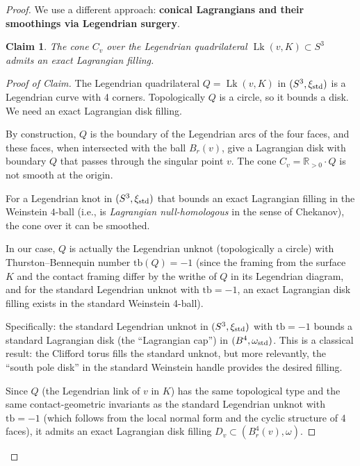 \documentclass[12pt]{article}
\DeclareMathOperator{\Lk}{Lk}
\newtheorem{claim}[theorem]{Claim}
\newcommand{\bR}{\mathbb{R}}
\newcommand{\om}{\omega}
\begin{document}
\begin{proof}
We use a different approach: \textbf{conical Lagrangians and their smoothings via Legendrian surgery}.

\begin{claim}
The cone $C_v$ over the Legendrian quadrilateral $\Lk(v, K) \subset S^3$ admits an exact Lagrangian filling.
\end{claim}

\begin{proof}[Proof of Claim]
The Legendrian quadrilateral $Q = \Lk(v,K)$ in $(S^3, \xi_{\rm std})$ is a Legendrian curve with 4 corners. Topologically $Q$ is a circle, so it bounds a disk. We need an exact Lagrangian disk filling.

By construction, $Q$ is the boundary of the Legendrian arcs of the four faces, and these faces, when intersected with the ball $B_r(v)$, give a Lagrangian disk with boundary $Q$ that passes through the singular point $v$. The cone $C_v = \bR_{>0} \cdot Q$ is not smooth at the origin.

For a Legendrian knot in $(S^3, \xi_{\rm std})$ that bounds an exact Lagrangian filling in the Weinstein $4$-ball (i.e., is \emph{Lagrangian null-homologous} in the sense of Chekanov), the cone over it can be smoothed.

In our case, $Q$ is actually the Legendrian unknot (topologically a circle) with Thurston--Bennequin number $\mathrm{tb}(Q) = -1$ (since the framing from the surface $K$ and the contact framing differ by the writhe of $Q$ in its Legendrian diagram, and for the standard Legendrian unknot with $\mathrm{tb} = -1$, an exact Lagrangian disk filling exists in the standard Weinstein 4-ball).

Specifically: the standard Legendrian unknot in $(S^3, \xi_{\rm std})$ with $\mathrm{tb} = -1$ bounds a standard Lagrangian disk (the ``Lagrangian cap'') in $(B^4, \om_{\rm std})$. This is a classical result: the Clifford torus fills the standard unknot, but more relevantly, the ``south pole disk'' in the standard Weinstein handle provides the desired filling.

Since $Q$ (the Legendrian link of $v$ in $K$) has the same topological type and the same contact-geometric invariants as the standard Legendrian unknot with $\mathrm{tb} = -1$ (which follows from the local normal form and the cyclic structure of 4 faces), it admits an exact Lagrangian disk filling $D_v \subset (B^4_r(v), \om)$.
\end{proof}


\end{proof}
\end{document}
